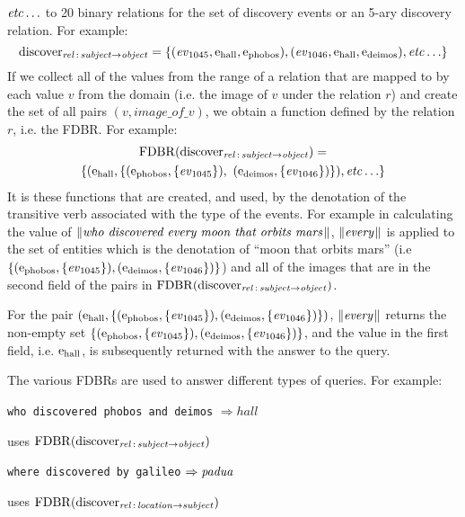 \documentclass[../main.tex]{subfiles}
\begin{document}
\begin{refsection}
\noindent $\etc$ to 20 binary relations for  the set of discovery events or an 5-ary discovery relation. For example:
\begin{equation*}
	\relationn{discover}{subject}{object} = \{(\event{1045}, \entity{hall}, \entity{phobos}), (\event{1046}, \entity{hall}, \entity{deimos}), \etc\}
\end{equation*}
If we collect all of the values from the range of a relation that are mapped to by each value $v$ from the domain (i.e. the image of $v$ under the relation $r$) and create the set of all pairs $(v, image\_of\_v)$, we obtain a function defined by the relation $r$, i.e. the FDBR. For example:
\begin{multline*}
	\FDBR{\relationn{discover}{subject}{object}} = \\ \{( \entity{hall}, \{(\entity{phobos}, \{\event{1045}\}),\ (\entity{deimos}, \{\event{1046}\}) \}),\etc\}
\end{multline*}
It is these functions that are created, and used, by the denotation of the transitive verb associated with the type of the events. For example in calculating the value of $\meaningof{who discovered every moon that orbits mars}$, $\meaningof{every}$ is applied to the set of entities which is the denotation of ``moon that orbits mars'' (i.e $\{ (\entity{phobos}, \{\event{1045}\}),\\ (\entity{deimos}, \{\event{1046}\})\}$) and all of the images that are in the second field of the pairs in $\FDBR{\relationn{discover}{subject}{object}}$.

For the pair $(\entity{hall}, \{(\entity{phobos}, \{\event{1045}\}), (\entity{deimos}, \{\event{1046}\})\})$, $\meaningof{every}$ returns the non-empty set $\{(\entity{phobos}, \{\event{1045}\}), (\entity{deimos}, \{\event{1046}\})\}$, and the value in the first field, i.e. $\entity{hall}$, is subsequently returned with the answer to the query.

The various FDBRs are used to answer different types of queries. For example: \\

\hspace{4em}\parbox{\linewidth}{
\texttt{who discovered phobos and deimos} $\Rightarrow hall$

\hspace{2em} uses $\FDBR{\relationn{discover}{subject}{object}}$

\texttt{where discovered by galileo} $\Rightarrow \opit{padua}$

\hspace{2em} uses $\FDBR{\relationn{discover}{location}{subject}}$

}
\end{refsection}
\end{document}
